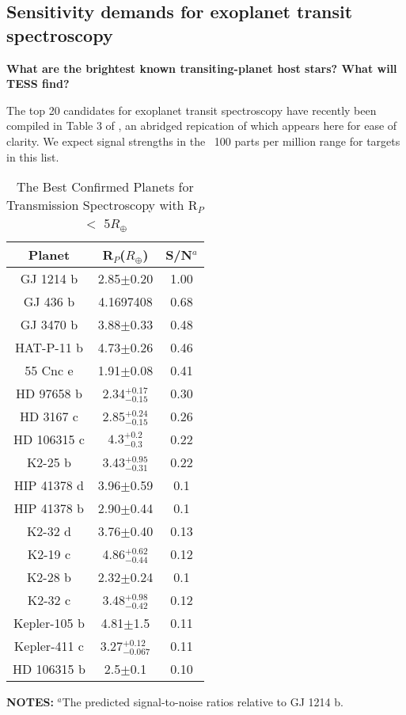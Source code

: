 \documentclass[12pt]{article}
\begin{document}
\subsection{Sensitivity demands for exoplanet transit spectroscopy}

\textbf{What are the brightest known transiting-planet host stars? What will TESS find?}

The top 20 candidates for exoplanet transit spectroscopy have recently been compiled in Table 3 of \cite{2017AJ....153..256R}, an abridged repication of which appears here for ease of clarity. We expect signal strengths in the ~100 parts per million range for targets in this list.

\begin{table}
 \centering
 \caption{The Best Confirmed Planets for Transmission Spectroscopy with R$_P$ $<$ 5$R_{\oplus}$ }
 \label{tbl:S/N}
 \begin{tabular}{ccc}
    \hline
    \hline
    Planet & R$_P$($R_{\oplus}$) & S/N$^a$ \\
    \hline
 GJ 1214 b  & 2.85$\pm$0.20 & 1.00 \\
 GJ 436 b  & 4.1697408 & 0.68 \\
 GJ 3470 b  & 3.88$\pm$0.33 & 0.48 \\
 HAT-P-11 b  & 4.73$\pm$0.26 & 0.46 \\
 55 Cnc e  & 1.91$\pm$0.08 & 0.41 \\
 HD 97658 b  & 2.34$^{+0.17}_{-0.15}$ & 0.30 \\
 HD 3167 c & 2.85$^{+0.24}_{-0.15}$ & 0.26 \\
 HD 106315 c & $4.3_{-0.3}^{+0.2}$ & 0.22 \\
 K2-25 b  & 3.43$^{+0.95}_{-0.31}$ & 0.22 \\
 HIP 41378 d  & 3.96$\pm$0.59 & 0.1 \\
 HIP 41378 b  & 2.90$\pm$0.44 & 0.1 \\
 K2-32 d  & 3.76$\pm$0.40 & 0.13 \\
 K2-19 c  & 4.86$^{+0.62}_{-0.44}$ & 0.12 \\
 K2-28 b  & 2.32$\pm$0.24 & 0.1 \\
 K2-32 c  & 3.48$^{+0.98}_{-0.42}$ & 0.12 \\
 Kepler-105 b  & 4.81$\pm$1.5 & 0.11 \\
 Kepler-411 c  & 3.27$^{+0.12}_{-0.067}$ & 0.11 \\
 HD 106315 b & 2.5$\pm$0.1 & 0.10 \\
   \hline
    \hline
 \end{tabular}
\begin{flushleft}
 \footnotesize{ \textbf{\textsc{NOTES:}}
$^a$The predicted signal-to-noise ratios relative to GJ 1214 b.
}
\end{flushleft}
\end{table}
\end{document}
